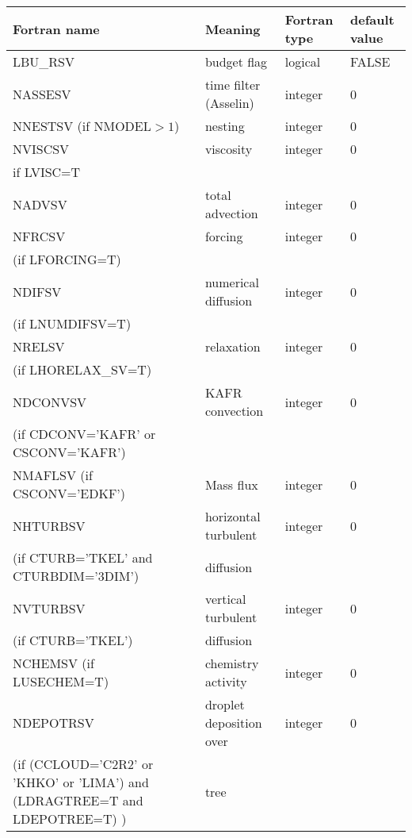 \begin{longtable} {|p{}|p{}|>{\centering}p{}|p{}<{\centering}|}
\hline
Fortran name & Meaning & Fortran type & default value \\
\hline \hline
\endhead
LBU\_RSV & budget flag & logical & FALSE\index{LBU\_RSV!\innam{NAM\_BU\_RSV}}\\\hline
NASSESV  & time filter (Asselin)   & integer  &  0 \index{NASSESV!\innam{NAM\_BU\_RSV}} \\\hline
NNESTSV (if NMODEL$>1$) & nesting       & integer  &  0 \index{NNESTSV!\innam{NAM\_BU\_RSV}} \\\hline
NVISCSV  & viscosity         & integer  &  0 \index{NVISCSV!\innam{NAM\_BU\_RSV}}\\
if LVISC=T &  &   &   \\\hline
NADVSV   & total advection   & integer  &  0 \index{NADVSV!\innam{NAM\_BU\_RSV}}\\\hline
NFRCSV   & forcing           & integer  &  0 \index{NFRCSV!\innam{NAM\_BU\_RSV}} \\ \nopagebreak
(if LFORCING=T) &  &   &   \\\hline
NDIFSV   & numerical diffusion & integer &  0 \index{NDIFSV!\innam{NAM\_BU\_RSV}}\\ \nopagebreak
(if LNUMDIFSV=T) &  &   &   \\\hline
NRELSV   & relaxation        & integer  &  0 \index{NRELSV!\innam{NAM\_BU\_RSV}}\\ \nopagebreak
(if LHORELAX\_SV=T) &  &   &   \\\hline
NDCONVSV & KAFR convection   & integer  &  0 \index{NDCONVSV!\innam{NAM\_BU\_RSV}} \\ \nopagebreak
(if CDCONV='KAFR' or CSCONV='KAFR') &  &   &   \\\hline
NMAFLSV (if CSCONV='EDKF') & Mass flux & integer  &  0 \index{NMAFLSV!\innam{NAM\_BU\_RSV}} \\\hline
NHTURBSV & horizontal turbulent  & integer  &  0 \index{NHTURBSV!\innam{NAM\_BU\_RSV}} \\ \nopagebreak
(if CTURB='TKEL' and CTURBDIM='3DIM') &diffusion &   &  \\\hline
NVTURBSV & vertical turbulent  & integer  &  0 \index{NVTURBSV!\innam{NAM\_BU\_RSV}}\\ \nopagebreak
(if CTURB='TKEL') &diffusion &   &  \\\hline
NCHEMSV (if LUSECHEM=T) & chemistry activity & integer  &  0 \index{NCHEMSV!\innam{NAM\_BU\_RSV}} \\\hline
NDEPOTRSV  & droplet deposition over    & integer  &  0 \index{NDEPOTRSV!\innam{NAM\_BU\_RSV}}\\ \nopagebreak
(if (CCLOUD='C2R2' or 'KHKO' or 'LIMA') and (LDRAGTREE=T and LDEPOTREE=T)  ) & tree &   &   \\\hline
\end{longtable}

